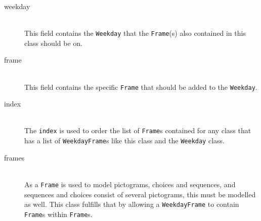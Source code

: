 \begin{table}[ht]
    \caption{Table that represents the \texttt{WeekdayFrame} class}
    \label{tbl:WeekdayFrame}
\end{table}

\begin{description}
    \item [weekday] \hfill \\
    This field contains the \texttt{Weekday} that the \texttt{Frame}(s) also contained in this class should be on.
    \item [frame] \hfill \\
    This field contains the specific \texttt{Frame} that should be added to the \texttt{Weekday}.
    \item [index] \hfill \\
    The \texttt{index} is used to order the list of \texttt{Frame}s contained for any class that has a list of \texttt{WeekdayFrame}s like this class and the \texttt{Weekday} class.
    \item [frames] \hfill \\
    As a \texttt{Frame} is used to model pictograms, choices and sequences, and sequences and choices consist of several pictograms, this must be modelled as well.
    This class fulfills that by allowing a \texttt{WeekdayFrame} to contain \texttt{Frame}s within \texttt{Frame}s.

\end{description}

